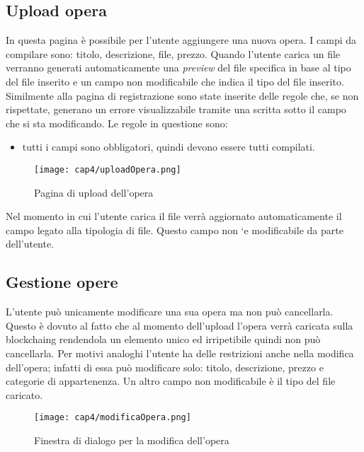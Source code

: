 \subsection{Upload opera}
\label{subsec:upload-opera}

In questa pagina è possibile per l'utente aggiungere una nuova opera. I campi da compilare sono: titolo, descrizione, file, prezzo. Quando l'utente carica un file verranno generati automaticamente una \textit{preview} del file specifica in base al tipo del file inserito e un campo non modificabile che indica il tipo del file inserito. Similmente alla pagina di registrazione sono state inserite delle regole che, se non rispettate, generano un errore visualizzabile tramite una scritta sotto il campo che si sta modificando. Le regole in questione sono:
\begin{itemize}
	\item tutti i campi sono obbligatori, quindi devono essere tutti compilati.
\end{itemize}
\begin{figure}[H]
	\begin{center}
		\texttt{[image: cap4/uploadOpera.png]}
		\caption{Pagina di upload dell'opera}
	\end{center}
\end{figure}
Nel momento in cui l’utente carica il file verrà aggiornato automaticamente il campo legato alla tipologia di file.
Questo campo non `e modificabile da parte dell'utente.
\subsection{Gestione opere}
\label{subsec:gestione-opere}

L'utente può unicamente modificare una sua opera ma non può cancellarla. Questo è dovuto al fatto che al momento dell'upload l'opera verrà caricata sulla \gls{blockchaing} rendendola un elemento unico ed irripetibile quindi non può cancellarla. Per motivi analoghi l'utente ha delle restrizioni anche nella modifica dell'opera; infatti di essa può modificare solo: titolo, descrizione, prezzo e categorie di appartenenza. Un altro campo non modificabile è il tipo del file caricato.
\begin{figure}[H]
	\begin{center}
		\texttt{[image: cap4/modificaOpera.png]}
		\caption{Finestra di dialogo per la modifica dell'opera}
	\end{center}
\end{figure}


